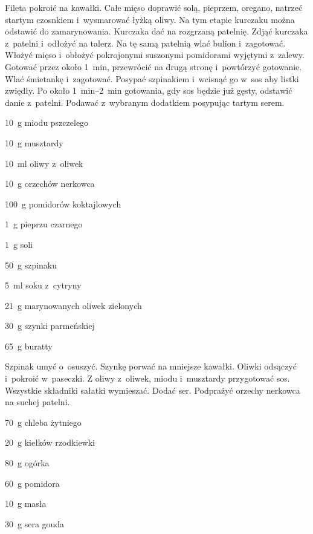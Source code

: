 \documentclass[../kucharek.tex]{subfiles}
\begin{document}
Fileta pokroić na kawałki. Całe mięso doprawić solą, pieprzem, oregano, natrzeć
startym czosnkiem i~wysmarować łyżką oliwy. Na tym etapie kurczaku można
odstawić do zamarynowania. Kurczaka dać na rozgrzaną patelnię. Zdjąć kurczaka
z~patelni i~odłożyć na talerz. Na tę samą patelnią wlać bulion i~zagotować.
Włożyć mięso i~obłożyć pokrojonymi suszonymi pomidorami wyjętymi z~zalewy.
Gotować przez około \qty{1}{\minute}, przewrócić na drugą stronę i~powtórzyć
gotowanie. Wlać śmietankę i~zagotować. Posypać szpinakiem i~wcisnąć go w~sos
aby listki zwiędły. Po około \qtyrange{1}{2}{\minute} gotowania, gdy sos będzie
już gęsty, odstawić danie z~patelni. Podawać z~wybranym dodatkiem posypując
tartym serem.


\begin{Ingred}
    \item \qty{10}{\gram} miodu pszczelego
    \item \qty{10}{\gram} musztardy
    \item \qty{10}{\milli\litre} oliwy z~oliwek
    \item \qty{10}{\gram} orzechów nerkowca
    \item \qty{100}{\gram} pomidorów koktajlowych
    \item \qty{1}{\gram} pieprzu czarnego
    \item \qty{1}{\gram} soli
    \item \qty{50}{\gram} szpinaku
    \item \qty{5}{\milli\litre} soku z~cytryny
    \item \qty{21}{\gram} marynowanych oliwek zielonych
    \item \qty{30}{\gram} szynki parmeńskiej
    \item \qty{65}{\gram} buratty
\end{Ingred}

Szpinak umyć o~osuszyć. Szynkę porwać na mniejsze kawałki. Oliwki odsączyć
i~pokroić w~paseczki. Z oliwy z~oliwek, miodu i~musztardy przygotować sos.
Wszystkie składniki sałatki wymieszać. Dodać ser. Podprażyć orzechy nerkowca na
suchej patelni.


\begin{Ingred}
    \item \qty{70}{\gram} chleba żytniego
    \item \qty{20}{\gram} kiełków rzodkiewki
    \item \qty{80}{\gram} ogórka
    \item \qty{60}{\gram} pomidora
    \item \qty{10}{\gram} masła
    \item \qty{30}{\gram} sera gouda
\end{Ingred}
\end{document}
